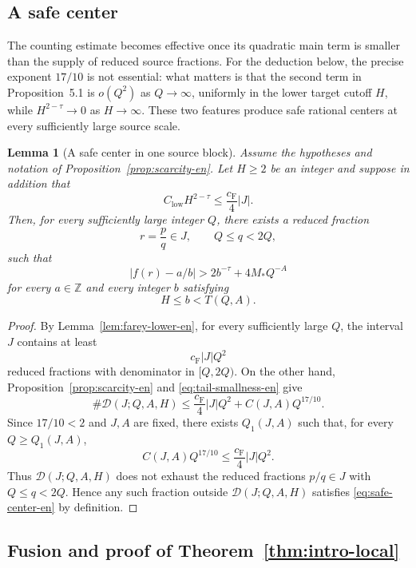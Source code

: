 \documentclass[11pt]{amsart}
\numberwithin{equation}{section}
\newtheorem{lemma}[lemma]{Lemma}
\theoremstyle{definition}
\theoremstyle{remark}
\newcommand{\Z}{\mathbb Z}
\newcommand{\abs}[1]{\left\lvert #1\right\rvert}
\begin{document}
\subsection{A safe center}

The counting estimate becomes effective once its quadratic main term
is smaller than the supply of reduced source fractions. For the
deduction below, the precise exponent $17/10$ is not essential: what
matters is that the second term in Proposition~5.1 is $o(Q^2)$ as
$Q\to\infty$, uniformly in the lower target cutoff $H$, while
$H^{2-\tau}\to0$ as $H\to\infty$. These two features produce safe
rational centers at every sufficiently large source scale.

\begin{lemma}[A safe center in one source block]
\label{lem:safe-center-en}
Assume the hypotheses and notation of
Proposition~\ref{prop:scarcity-en}. Let $H\geq2$ be an integer and
suppose in addition that
\begin{equation}\label{eq:tail-smallness-en}
C_{\mathrm{low}}H^{2-\tau}
\leq
\frac{c_{\mathrm F}}4|J|.
\end{equation}
Then, for every sufficiently large integer $Q$, there exists a reduced
fraction
\[
r=\frac pq\in J,
\qquad Q\leq q<2Q,
\]
such that
\begin{equation}\label{eq:safe-center-en}
\abs{f(r)-a/b}
>
2b^{-\tau}+4M_*Q^{-A}
\end{equation}
for every $a\in\Z$ and every integer $b$ satisfying
\[
H\leq b<T(Q,A).
\]
\end{lemma}

\begin{proof}
By Lemma~\ref{lem:farey-lower-en}, for every sufficiently large $Q$,
the interval $J$ contains at least
\[
c_{\mathrm F}|J|Q^2
\]
reduced fractions with denominator in $[Q,2Q)$. On the other hand,
Proposition~\ref{prop:scarcity-en} and
\eqref{eq:tail-smallness-en} give
\[
\#\mathcal D(J;Q,A,H)
\leq
\frac{c_{\mathrm F}}4|J|Q^2+C(J,A)Q^{17/10}.
\]
Since $17/10<2$ and $J,A$ are fixed, there exists
$Q_1(J,A)$ such that, for every $Q\geq Q_1(J,A)$,
\[
C(J,A)Q^{17/10}
\leq
\frac{c_{\mathrm F}}4|J|Q^2.
\]
Thus $\mathcal D(J;Q,A,H)$ does not exhaust the reduced fractions
$p/q\in J$ with $Q\leq q<2Q$. Hence any such fraction outside
$\mathcal D(J;Q,A,H)$ satisfies \eqref{eq:safe-center-en} by definition.
\end{proof}

\subsection{Fusion and proof of Theorem~\ref{thm:intro-local}}
\end{document}
